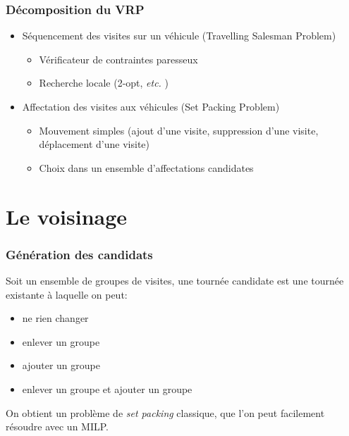 \documentclass[table]{beamer}
\newcommand*{\foreign}[2][english]{%
    \emph{\foreignlanguage{#1}{#2}}%
}
\begin{document}
\begin{frame}
  \frametitle{Décomposition du VRP}

  \begin{itemize}
  \item Séquencement des visites sur un véhicule (Travelling Salesman Problem)
    \begin{itemize}
    \item Vérificateur de contraintes paresseux
    \item Recherche locale (2-opt, \foreign{etc.})
    \end{itemize}
  \item Affectation des visites aux véhicules (Set Packing Problem)
    \begin{itemize}
    \item Mouvement simples (ajout d'une visite, suppression d'une
      visite, déplacement d'une visite)
    \item Choix dans un ensemble d'affectations candidates
    \end{itemize}
  \end{itemize}
\end{frame}

\section{Le voisinage}

\begin{frame}
  \frametitle{Génération des candidats}

  Soit un ensemble de groupes de visites, une tournée candidate est
  une tournée existante à laquelle on peut:

  \begin{itemize}
  \item ne rien changer
  \item enlever un groupe
  \item ajouter un groupe
  \item enlever un groupe et ajouter un groupe
  \end{itemize}

  On obtient un problème de \foreign{set packing} classique, que l'on peut
  facilement résoudre avec un MILP.
\end{frame}
\end{document}
